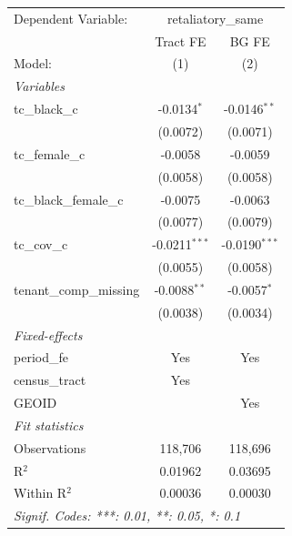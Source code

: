 \begin{tabular}{lcc}
   \tabularnewline \midrule \midrule
   Dependent Variable: & \multicolumn{2}{c}{retaliatory\_same}\\
                           & Tract FE        & BG FE \\   
   Model:                  & (1)             & (2)\\  
   \midrule
   \emph{Variables}\\
   tc\_black\_c            & -0.0134$^{*}$   & -0.0146$^{**}$\\   
                           & (0.0072)        & (0.0071)\\   
   tc\_female\_c           & -0.0058         & -0.0059\\   
                           & (0.0058)        & (0.0058)\\   
   tc\_black\_female\_c    & -0.0075         & -0.0063\\   
                           & (0.0077)        & (0.0079)\\   
   tc\_cov\_c              & -0.0211$^{***}$ & -0.0190$^{***}$\\   
                           & (0.0055)        & (0.0058)\\   
   tenant\_comp\_missing   & -0.0088$^{**}$  & -0.0057$^{*}$\\   
                           & (0.0038)        & (0.0034)\\   
   \midrule
   \emph{Fixed-effects}\\
   period\_fe              & Yes             & Yes\\  
   census\_tract           & Yes             & \\  
   GEOID                   &                 & Yes\\  
   \midrule
   \emph{Fit statistics}\\
   Observations            & 118,706         & 118,696\\  
   R$^2$                   & 0.01962         & 0.03695\\  
   Within R$^2$            & 0.00036         & 0.00030\\  
   \midrule \midrule
   \multicolumn{3}{l}{\emph{Signif. Codes: ***: 0.01, **: 0.05, *: 0.1}}\\
\end{tabular}
\par\endgroup
\begingroup
\centering
